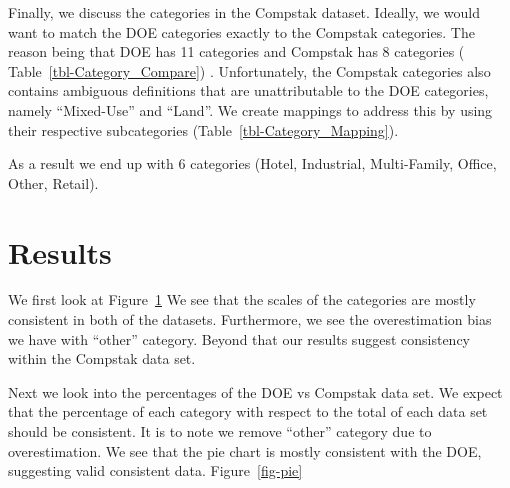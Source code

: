 \documentclass[
  12pt]{article}
\begin{document}
Finally, we discuss the categories in the Compstak dataset. Ideally, we
would want to match the DOE categories exactly to the Compstak
categories. The reason being that DOE has 11 categories and Compstak has
8 categories ( Table~\ref{tbl-Category_Compare}) . Unfortunately, the
Compstak categories also contains ambiguous definitions that are
unattributable to the DOE categories, namely ``Mixed-Use'' and ``Land''.
We create mappings to address this by using their respective
subcategories (Table~\ref{tbl-Category_Mapping}).

As a result we end up with 6 categories (Hotel, Industrial,
Multi-Family, Office, Other, Retail).

\section{Results}\label{results}

We first look at Figure~\ref{fig-count} We see that the scales of the
categories are mostly consistent in both of the datasets. Furthermore,
we see the overestimation bias we have with ``other'' category. Beyond
that our results suggest consistency within the Compstak data set.

\begin{figure}


\caption{\label{fig-count}}

\end{figure}%

Next we look into the percentages of the DOE vs Compstak data set. We
expect that the percentage of each category with respect to the total of
each data set should be consistent. It is to note we remove ``other''
category due to overestimation. We see that the pie chart is mostly
consistent with the DOE, suggesting valid consistent data.
Figure~\ref{fig-pie}
\end{document}
